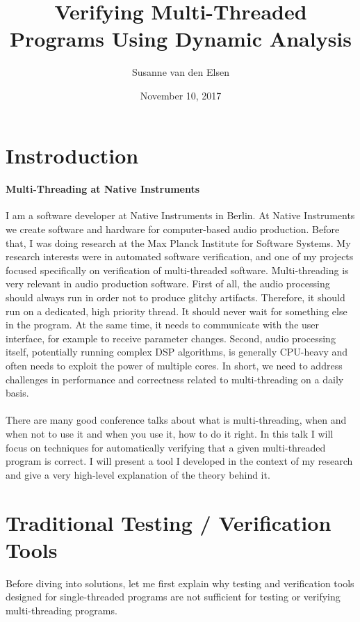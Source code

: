 \documentclass[]{article}
\begin{document}
\title{Verifying Multi-Threaded Programs Using Dynamic Analysis}
\author{Susanne van den Elsen}
\date{November 10, 2017}
\maketitle


\section*{Instroduction}
\paragraph{Multi-Threading at Native Instruments}
I am a software developer at Native Instruments in Berlin. 
At Native Instruments we create software and hardware for computer-based audio production.
Before that, I was doing research at the Max Planck Institute for Software Systems.
My research interests were in automated software verification, and one of my projects focused specifically on
verification of multi-threaded software.
Multi-threading is very relevant in audio production software.
First of all, the audio processing should always run in order not to produce glitchy artifacts. 
Therefore, it should run on a dedicated, high priority thread.
It should never wait for something else in the program.
At the same time, it needs to communicate with the user interface, for example to receive parameter changes.
Second, audio processing itself, potentially running complex DSP algorithms, is generally CPU-heavy and often needs to 
exploit the power of multiple cores.
In short, we need to address challenges in performance and correctness related to multi-threading on a daily basis.

\paragraph{}
There are many good conference talks about what is multi-threading, when and when not to use it and when you use it, 
how to do it right.
In this talk I will focus on techniques for automatically verifying that a given multi-threaded program is correct.
I will present a tool I developed in the context of my research and give a very high-level explanation of the theory
behind it.


\section*{Traditional Testing / Verification Tools}
Before diving into solutions, let me first explain why testing and verification tools designed for single-threaded 
programs are not sufficient for testing or verifying multi-threading programs.
\end{document}

